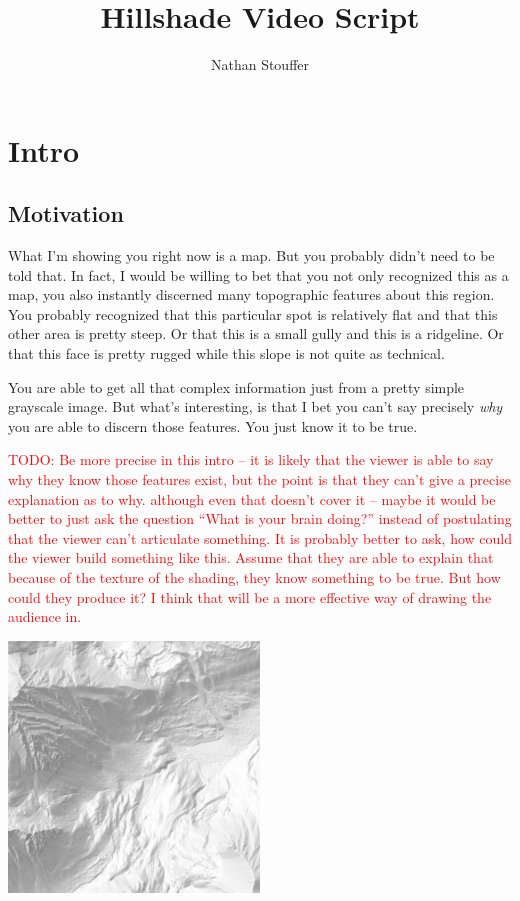 \documentclass{article}
\newcommand\todo[1]{\textcolor{red}{TODO: #1}}
\begin{document}
	
\title{Hillshade Video Script}
\author{Nathan Stouffer}
\date{}
\maketitle

\section{Intro}

\subsection{Motivation}

What I'm showing you right now is a map.
But you probably didn't need to be told that.
In fact, I would be willing to bet that you not only recognized this as a map, you also instantly discerned many topographic features about this region.
You probably recognized that this particular spot is relatively flat and that this other area is pretty steep.
Or that this is a small gully and this is a ridgeline.
Or that this face is pretty rugged while this slope is not quite as technical.

You are able to get all that complex information just from a pretty simple grayscale image.
But what's interesting, is that I bet you can't say precisely \textit{why} you are able to discern those features.
You just know it to be true.

\todo{Be more precise in this intro -- it is likely that the viewer is able to say why they know those features exist, but the point is that they can't give a precise explanation as to why. although even that doesn't cover it -- maybe it would be better to just ask the question ``What is your brain doing?'' instead of postulating that the viewer can't articulate something. It is probably better to ask, how could the viewer build something like this. Assume that they are able to explain that because of the texture of the shading, they know something to be true. But how could they produce it? I think that will be a more effective way of drawing the audience in.}

\begin{center}
	\includegraphics[width=0.5\textwidth,frame]{assets/hillshade-example.png}
\end{center}
\end{document}
